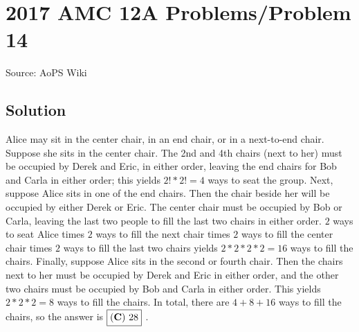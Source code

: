 \documentclass[12pt]{article}
\begin{document}
\section*{{2017 AMC 12A Problems/Problem 14}}
Source: AoPS Wiki

\subsection*{Solution}
Alice may sit in the center chair, in an end chair, or in a next-to-end chair. Suppose she sits in the center chair. The 2nd and 4th chairs (next to her) must be occupied by Derek and Eric, in either order, leaving the end chairs for Bob and Carla in either order; this yields $2! * 2! = 4$ ways to seat the group. Next, suppose Alice sits in one of the end chairs. Then the chair beside her will be occupied by either Derek or Eric. The center chair must be occupied by Bob or Carla, leaving the last two people to fill the last two chairs in either order. $2$ ways to seat Alice times $2$ ways to fill the next chair times $2$ ways to fill the center chair times $2$ ways to fill the last two chairs yields $2 * 2 * 2 * 2 = 16$ ways to fill the chairs. Finally, suppose Alice sits in the second or fourth chair. Then the chairs next to her must be occupied by Derek and Eric in either order, and the other two chairs must be occupied by Bob and Carla in either order. This yields $2 * 2 * 2 = 8$ ways to fill the chairs. In total, there are $4 + 8 + 16$ ways to fill the chairs, so the answer is $\boxed{\bold{(C)}\ 28}$ .
\end{document}
